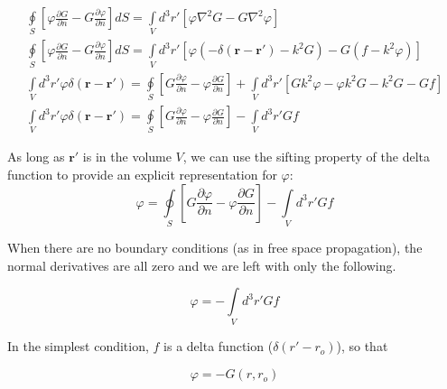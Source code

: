 \begin{equation}
\begin{gathered}
\oint\limits_{S} \left[ \varphi\frac{\partial G}{\partial n} - G\frac{\partial \varphi}{\partial n} \right]dS = \int\limits_{V}d^3r' \left[ \varphi\nabla^2G- G \nabla^2 \varphi\right] \\
\oint\limits_{S} \left[ \varphi\frac{\partial G}{\partial n} - G\frac{\partial \varphi}{\partial n} \right]dS = \int\limits_{V}d^3r' \left[ \varphi \left(-\delta\left(\mathbf{r}-\mathbf{r}' \right) - k^2G\right)- G \left(f - k^2\varphi \right)\right] \\
\int\limits_{V}d^3r'\varphi\delta\left(\mathbf{r}-\mathbf{r}' \right) = \oint\limits_{S}\left[G\frac{\partial \varphi}{\partial n} - \varphi\frac{\partial G}{\partial n} \right] +\int\limits_{V}d^3r'\left[ Gk^2\varphi - \varphi k^2G-k^2G - Gf \right] \\
\int\limits_{V}d^3r'\varphi\delta\left(\mathbf{r}-\mathbf{r}' \right) = \oint\limits_{S}\left[G\frac{\partial \varphi}{\partial n} - \varphi\frac{\partial G}{\partial n} \right] -\int\limits_{V}d^3r' Gf
\end{gathered}
\label{gf_eq:10}
\end{equation}
\renewcommand{\baselinestretch}{2} \small\normalsize

As long as $\mathbf{r}'$ is in the volume $V$, we can use the sifting property of the delta function to provide an explicit representation for $\varphi$:
\begin{equation}
\boxed{\varphi = \oint\limits_{S}\left[G\frac{\partial \varphi}{\partial n} - \varphi\frac{\partial G}{\partial n} \right] -\int\limits_{V}d^3r' Gf}
\label{gf_eq:11}
\end{equation}
\renewcommand{\baselinestretch}{2} \small\normalsize

When there are no boundary conditions (as in free space propagation), the normal derivatives are all zero and we are left with only the following.

\begin{equation}
\varphi = -\int\limits_{V}d^3r' Gf
\label{gf_eq:11aa}
\end{equation}
\renewcommand{\baselinestretch}{2} \small\normalsize

In the simplest condition, $f$ is a delta function ($\delta(r'-r_o)$), so that

\begin{equation}
\varphi = -G(r,r_o)
\label{gf_eq:11aa}
\end{equation}
\renewcommand{\baselinestretch}{2} \small\normalsize

